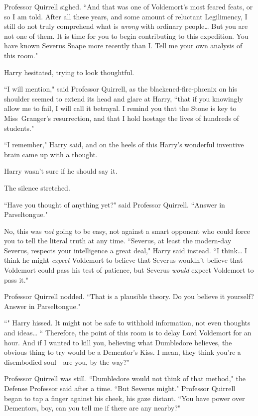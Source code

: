 Professor Quirrell sighed. ``And that was one of Voldemort's most feared feats, or so I am told. After all these years, and some amount of reluctant Legilimency, I still do not truly comprehend what is \emph{wrong} with ordinary people{\ldots} But you are not one of them. It is time for you to begin contributing to this expedition. You have known Severus Snape more recently than I\@. Tell me your own analysis of this room."

Harry hesitated, trying to look thoughtful.

``I will mention," said Professor Quirrell, as the blackened-fire-phœnix on his shoulder seemed to extend its head and glare at Harry, ``that if you knowingly allow me to fail, I will call it betrayal. I remind you that the Stone is key to Miss~Granger's resurrection, and that I hold hostage the lives of hundreds of students."

``I remember," Harry said, and on the heels of this Harry's wonderful inventive brain came up with a thought.

Harry wasn't sure if he should say it.

The silence stretched.

``Have you thought of anything yet?" said Professor Quirrell. ``Answer in Parseltongue."

No, this was \emph{not} going to be easy, not against a smart opponent who could force you to tell the literal truth at any time. ``Severus, at least the modern-day Severus, respects your intelligence a great deal," Harry said instead. ``I think{\ldots} I think he might \emph{expect} Voldemort to believe that Severus wouldn't believe that Voldemort could pass his test of patience, but Severus \emph{would} expect Voldemort to pass it."

Professor Quirrell nodded. ``That is a plausible theory. Do you believe it yourself? Answer in Parseltongue."

``" Harry hissed. It might not be safe to withhold information, not even thoughts and ideas{\ldots} `` Therefore, the point of this room is to delay Lord Voldemort for an hour. And if I wanted to kill you, believing what Dumbledore believes, the obvious thing to try would be a Dementor's Kiss. I mean, they think you're a disembodied soul—are you, by the way?"

Professor Quirrell was still. ``Dumbledore would not think of that method," the Defense Professor said after a time. ``But Severus might." Professor Quirrell began to tap a finger against his cheek, his gaze distant. ``You have power over Dementors, boy, can you tell me if there are any nearby?"

